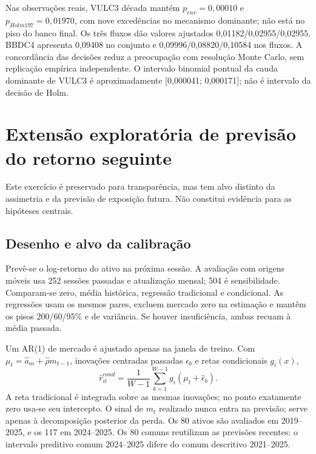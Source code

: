 \begin{table}[htbp]
\centering
\caption{FWER do envelope final sob nulidade global(\%). Mil réplicas
por mecanismo; banco independente de 99.999 por mecanismo protegido.
Colchetes: Wilson 95\% Monte Carlo. Os três últimos são estresses
fora da classe protegida.}
\label{tab:mc-e}

\end{table}

Nas observações reais, VULC3 década mantém $p_{env}=0,00010$
e $p_{Holm197}=0,01970$, com nove excedências no mecanismo
dominante; não está no piso do banco final. Os três fluxos dão
valores ajustados 0,01182/0,02955/0,02955. BBDC4 apresenta
0,09408 no conjunto e 0,09996/0,08820/0,10584 nos fluxos.
A concordância das decisões reduz a preocupação com resolução
Monte Carlo, sem replicação empírica independente. O intervalo
binomial pontual da cauda dominante de VULC3 é aproximadamente
[0,000041; 0,000171]; não é intervalo da decisão de Holm.

\section{Extensão exploratória de previsão do retorno seguinte}
\label{app:previsao}
Este exercício é preservado para transparência, mas tem alvo distinto
da assimetria e da previsão de exposição futura. Não constitui evidência
para as hipóteses centrais.

\subsection{Desenho e alvo da calibração}
Prevê-se o log-retorno do ativo na próxima sessão. A avaliação com
origens móveis \cite{hyndman2021} usa 252 sessões passadas e atualização
mensal; 504 é sensibilidade. Comparam-se zero, média histórica,
regressão tradicional e condicional. As regressões usam os mesmos
pares, excluem mercado zero na estimação e mantêm os pisos 200/60/95\%
e de variância. Se houver insuficiência, ambas recuam à média passada.

Um AR(1) de mercado é ajustado apenas na janela de treino. Com
$\mu_t=\widehat a_m+\widehat\rho m_{t-1}$, inovações centradas
passadas $\widehat\epsilon_b $ e retas condicionais $g_i(x)$,
\begin{equation}
\widehat r^{cond}_{it}=\frac{1}{W-1}\sum_{b=1}^{W-1}
 g_i(\mu_t+\widehat\epsilon_b).
\end{equation}
A reta tradicional é integrada sobre as mesmas inovações; no ponto
exatamente zero usa-se seu intercepto. O sinal de $m_t $ realizado
nunca entra na previsão; serve apenas à decomposição posterior da perda.
Os 80 ativos são avaliados em 2019--2025, e os 117 em 2024--2025.
Os 80 comuns reutilizam as previsões recentes: o intervalo preditivo
comum 2024--2025 difere do comum descritivo 2021--2025.

